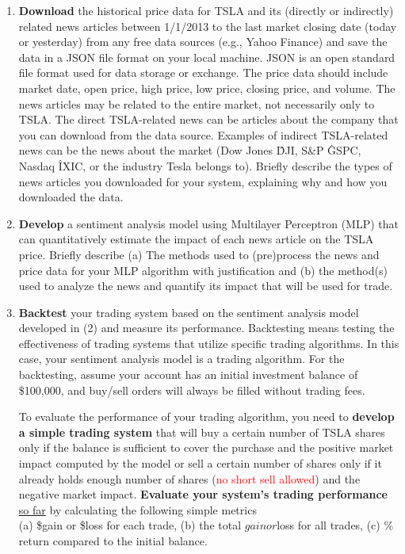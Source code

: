 \documentclass[twocolumn,10pt]{article}
\begin{document}
\begin{multicols}{2}
\begin{flushleft}
\begin{enumerate}
	\item \textbf{Download} the historical price data for TSLA and its (directly or indirectly) related news articles between 1/1/2013 to the last market closing date (today or yesterday) from any free data sources (e.g., Yahoo Finance) and save the data in a JSON file format on your local machine. JSON is an open standard file format used for data storage or exchange. The price data should include market date, open price, high price, low price, closing price, and volume. The news articles may be related to the entire market, not necessarily only to TSLA. The direct TSLA-related news can be articles about the company that you can download from the data source. Examples of indirect TSLA-related news can be the news about the market (Dow Jones \^DJI, S\&P \^GSPC, Nasdaq \^IXIC, or the industry Tesla belongs to). Briefly describe the types of news articles you downloaded for your system, explaining why and how you downloaded the data.
	
	\item \textbf{Develop} a sentiment analysis model using Multilayer Perceptron (MLP) that can quantitatively estimate the impact of each news article on the TSLA price. Briefly describe 
		\subitem (a) The methods used to (pre)process the news and price data for your MLP algorithm with justification and 
		\subitem (b) the method(s) used to analyze the news and quantify its impact that will be used for trade.
	
	\item \textbf{Backtest} your trading system based on the sentiment analysis model developed in (2) and measure its performance. Backtesting means testing the effectiveness of trading systems that utilize specific trading algorithms. In this case, your sentiment analysis model is a trading algorithm. For the backtesting, assume your account has an initial investment balance of \$100,000, and buy/sell orders will always be filled without trading fees. 

	To evaluate the performance of your trading algorithm, you need to \textbf{develop a simple trading system} that will buy a certain number of TSLA shares only if the balance is sufficient to cover the purchase and the positive market impact computed by the model or sell a certain number of shares only if it already holds enough number of shares (\textcolor{red}{no short sell allowed}) and the negative market impact. 
	\textbf{Evaluate your system’s trading performance} \underline{so far} by calculating the following simple metrics\\
		\subitem (a) \$gain or \$loss for each trade, 
		\subitem (b) the total $gain or $loss for all trades, 
		\subitem (c) \% return compared to the initial balance. 
		

\end{enumerate}
\end{flushleft}
\end{multicols}
\end{document}
